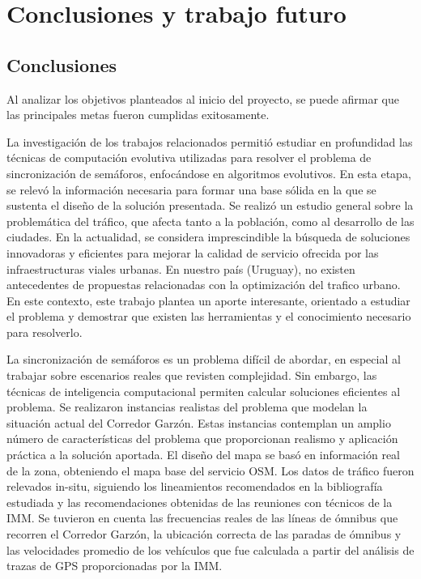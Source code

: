\chapter{Conclusiones y trabajo futuro}

\section{Conclusiones}
Al analizar los objetivos planteados al inicio del proyecto, se puede afirmar que las principales metas fueron cumplidas exitosamente.

La investigación de los trabajos relacionados permitió estudiar en profundidad las técnicas de computación evolutiva utilizadas para resolver el problema de sincronización de semáforos, enfocándose en algoritmos evolutivos. En esta etapa, se relevó la información necesaria para formar una base sólida en la que se sustenta el diseño de la solución presentada. Se realizó un estudio general sobre la problemática del tráfico, que afecta tanto a la población, como al desarrollo de las ciudades. En la actualidad, se considera imprescindible la búsqueda de soluciones innovadoras y eficientes para mejorar la calidad de servicio ofrecida por las infraestructuras viales urbanas. En nuestro país (Uruguay), no existen antecedentes de propuestas relacionadas con la optimización del trafico urbano. En este contexto, este trabajo plantea un aporte interesante, orientado a estudiar el problema y demostrar que existen las herramientas y el conocimiento necesario para resolverlo.

La sincronización de semáforos es un problema difícil de abordar, en especial al trabajar sobre escenarios reales que revisten complejidad. Sin embargo, las técnicas de inteligencia computacional permiten calcular soluciones eficientes al problema. Se realizaron instancias realistas del problema que modelan la situación actual del Corredor Garzón. Estas instancias contemplan un amplio número de características del problema que proporcionan realismo y aplicación práctica a la solución aportada. El diseño del mapa se basó en información real de la zona, obteniendo el mapa base del servicio OSM. Los datos de tráfico fueron relevados in-situ, siguiendo los lineamientos recomendados en la bibliografía estudiada y las recomendaciones obtenidas de las reuniones con técnicos de la IMM. Se tuvieron en cuenta las frecuencias reales de las líneas de ómnibus que recorren el Corredor Garzón, la ubicación correcta de las paradas de ómnibus y las velocidades promedio de los vehículos que fue calculada a partir del análisis de trazas de GPS proporcionadas por la IMM.
 \newpage
 
